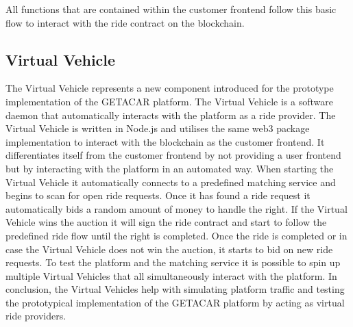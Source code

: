 All functions that are contained within the customer frontend follow this basic flow to interact with the ride contract on the blockchain.


\subsection{Virtual Vehicle}
The Virtual Vehicle represents a new component introduced for the prototype implementation of the GETACAR platform. The Virtual Vehicle is a software daemon that automatically interacts with the platform as a ride provider. The Virtual Vehicle is written in Node.js and utilises the same web3 package implementation to interact with the blockchain as the customer frontend. It differentiates itself from the customer frontend by not providing a user frontend but by interacting with the platform in an automated way. When starting the Virtual Vehicle it automatically connects to a predefined matching service and begins to scan for open ride requests. Once it has found a ride request it automatically bids a random amount of money to handle the right. If the Virtual Vehicle wins the auction it will sign the ride contract and start to follow the predefined ride flow until the right is completed. Once the ride is completed or in case the Virtual Vehicle does not win the auction, it starts to bid on new ride requests. To test the platform and the matching service it is possible to spin up multiple Virtual Vehicles that all simultaneously interact with the platform. 
In conclusion, the Virtual Vehicles help with simulating platform traffic and testing the prototypical implementation of the GETACAR platform by acting as virtual ride providers. 